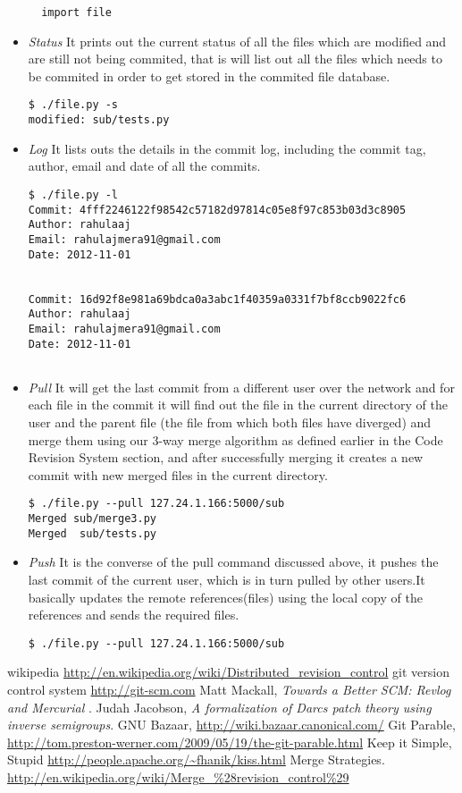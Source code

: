 \documentclass[12pt]{article}
\begin{document}
\begin{itemize}
\begin{lstlisting}
  import file 
\end{lstlisting}
\item \emph{Status} It prints out the current status of all the files which are modified and are still not being commited, that is will list out all the files which needs to be commited in order to get stored in the commited file database.
\begin{lstlisting}
$ ./file.py -s
modified: sub/tests.py
\end{lstlisting}
\item \emph{Log} It lists outs the details in the commit log, including the commit tag, author, email and date of all the commits.
\begin{lstlisting}
$ ./file.py -l
Commit: 4fff2246122f98542c57182d97814c05e8f97c853b03d3c8905
Author: rahulaaj
Email: rahulajmera91@gmail.com
Date: 2012-11-01


Commit: 16d92f8e981a69bdca0a3abc1f40359a0331f7bf8ccb9022fc6
Author: rahulaaj
Email: rahulajmera91@gmail.com
Date: 2012-11-01


\end{lstlisting}
\item \emph{Pull} It will get the last commit from a different user over the network and for each file in the commit it will find out the file in the current directory of the user and the parent file (the file from which both files have diverged) and merge them using our 3-way merge algorithm as defined earlier in the Code Revision System section, and after successfully merging it creates a new commit with new merged files in the current directory.
\begin{lstlisting}
$ ./file.py --pull 127.24.1.166:5000/sub
Merged sub/merge3.py
Merged  sub/tests.py
\end{lstlisting}
\item \emph{Push} It is the converse of the pull command discussed above, it pushes the last commit of the current user, which is in turn pulled by other users.It basically updates the remote references(files) using the local copy of the references and sends the required files. 
\begin{lstlisting}
$ ./file.py --pull 127.24.1.166:5000/sub
\end{lstlisting}
\end{itemize}
\begin{thebibliography}{99}
wikipedia \url{http://en.wikipedia.org/wiki/Distributed_revision_control}
git version control system \url{http://git-scm.com}
Matt Mackall, \emph{Towards a Better SCM: Revlog and Mercurial} .
Judah Jacobson, \emph{A formalization of Darcs patch theory using inverse
  semigroups}.
GNU Bazaar, \url{http://wiki.bazaar.canonical.com/}
Git Parable,
\url{http://tom.preston-werner.com/2009/05/19/the-git-parable.html}
Keep it Simple, Stupid
\url{http://people.apache.org/~fhanik/kiss.html}
Merge Strategies.
\url{http://en.wikipedia.org/wiki/Merge_%28revision_control%29}
\end{thebibliography}
\end{document}
